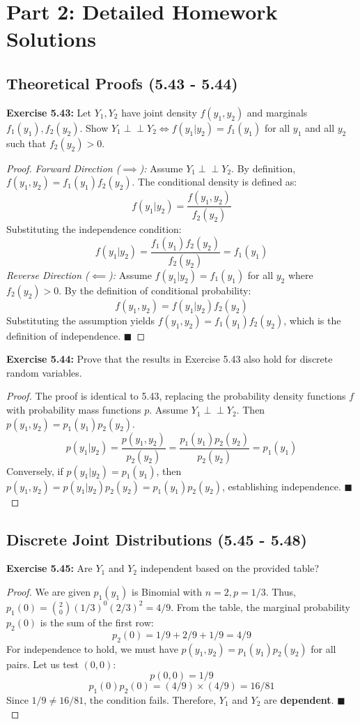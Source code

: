 \documentclass[11pt, a4paper]{article}
\theoremstyle{definition}
\theoremstyle{remark}
\newcommand{\indep}{\perp\!\!\!\perp}
\begin{document}
\newpage
\section{Part 2: Detailed Homework Solutions}

\subsection{Theoretical Proofs (5.43 - 5.44)}

\textbf{Exercise 5.43:} Let $Y_1, Y_2$ have joint density $f(y_1, y_2)$ and marginals $f_1(y_1), f_2(y_2)$. Show $Y_1 \indep Y_2 \iff f(y_1|y_2) = f_1(y_1)$ for all $y_1$ and all $y_2$ such that $f_2(y_2) > 0$.
\begin{proof}
\textit{Forward Direction ($\implies$):} Assume $Y_1 \indep Y_2$. By definition, $f(y_1, y_2) = f_1(y_1)f_2(y_2)$. The conditional density is defined as:
\[ f(y_1|y_2) = \frac{f(y_1, y_2)}{f_2(y_2)} \]
Substituting the independence condition:
\[ f(y_1|y_2) = \frac{f_1(y_1)f_2(y_2)}{f_2(y_2)} = f_1(y_1) \]
\textit{Reverse Direction ($\impliedby$):} Assume $f(y_1|y_2) = f_1(y_1)$ for all $y_2$ where $f_2(y_2) > 0$. By the definition of conditional probability:
\[ f(y_1, y_2) = f(y_1|y_2)f_2(y_2) \]
Substituting the assumption yields $f(y_1, y_2) = f_1(y_1)f_2(y_2)$, which is the definition of independence. $\blacksquare$
\end{proof}

\textbf{Exercise 5.44:} Prove that the results in Exercise 5.43 also hold for discrete random variables.
\begin{proof}
The proof is identical to 5.43, replacing the probability density functions $f$ with probability mass functions $p$.
Assume $Y_1 \indep Y_2$. Then $p(y_1, y_2) = p_1(y_1)p_2(y_2)$.
\[ p(y_1|y_2) = \frac{p(y_1, y_2)}{p_2(y_2)} = \frac{p_1(y_1)p_2(y_2)}{p_2(y_2)} = p_1(y_1) \]
Conversely, if $p(y_1|y_2) = p_1(y_1)$, then $p(y_1, y_2) = p(y_1|y_2)p_2(y_2) = p_1(y_1)p_2(y_2)$, establishing independence. $\blacksquare$
\end{proof}

\subsection{Discrete Joint Distributions (5.45 - 5.48)}

\textbf{Exercise 5.45:} Are $Y_1$ and $Y_2$ independent based on the provided table?
\begin{proof}
We are given $p_1(y_1)$ is Binomial with $n=2, p=1/3$. Thus, $p_1(0) = \binom{2}{0}(1/3)^0(2/3)^2 = 4/9$.
From the table, the marginal probability $p_2(0)$ is the sum of the first row:
\[ p_2(0) = 1/9 + 2/9 + 1/9 = 4/9 \]
For independence to hold, we must have $p(y_1, y_2) = p_1(y_1)p_2(y_2)$ for all pairs. Let us test $(0,0)$:
\[ p(0,0) = 1/9 \]
\[ p_1(0)p_2(0) = (4/9) \times (4/9) = 16/81 \]
Since $1/9 \neq 16/81$, the condition fails. Therefore, $Y_1$ and $Y_2$ are \textbf{dependent}. $\blacksquare$
\end{proof}
\end{document}
